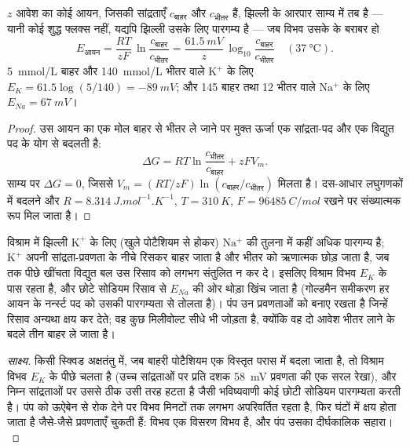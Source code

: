 \begin{theorem}[नर्न्स्ट समीकरण]\label{thm:b1:membranes-transport:nernst}
$z$ आवेश का कोई आयन, जिसकी सांद्रताएँ $c_{\text{बाहर}}$ और
$c_{\text{भीतर}}$ हैं, झिल्ली के आरपार साम्य में तब है --- यानी कोई
शुद्ध फ्लक्स नहीं, यद्यपि झिल्ली उसके लिए पारगम्य है --- जब विभव उसके
\emph{} के बराबर हो
\[
E_{\text{आयन}} = \frac{RT}{zF}\,\ln\frac{c_{\text{बाहर}}}{c_{\text{भीतर}}}
= \frac{\qty{61.5}{mV}}{z}\,\log_{10}\frac{c_{\text{बाहर}}}{c_{\text{भीतर}}}
\quad (\qty{37}{\celsius}).
\]
\qty{5}{mmol/L} बाहर और \qty{140}{mmol/L} भीतर वाले $\mathrm{K^+}$ के
लिए $E_K = 61.5\log(5/140) = \qty{-89}{mV}$; और \qty{145}{} बाहर तथा
\qty{12}{} भीतर वाले $\mathrm{Na^+}$ के लिए $E_{Na} = \qty{+67}{mV}$।
\end{theorem}
\begin{proof}
उस आयन का एक मोल बाहर से भीतर ले जाने पर मुक्त ऊर्जा एक सांद्रता-पद और
एक विद्युत पद के योग से बदलती है:
\[
\Delta G = RT\ln\frac{c_{\text{भीतर}}}{c_{\text{बाहर}}} + zFV_m .
\]
साम्य पर $\Delta G = 0$, जिससे $V_m = (RT/zF)\ln(c_{\text{बाहर}}/c_{\text{भीतर}})$ मिलता है।
दस-आधार लघुगणकों में बदलने और $R = \qty{8.314}{J.mol^{-1}.K^{-1}}$,
$T = \qty{310}{K}$, $F = \qty{96485}{C/mol}$ रखने पर संख्यात्मक रूप मिल
जाता है।
\end{proof}

\begin{proposition}[विश्राम विभव का उद्गम]\label{prop:b1:membranes-transport:resting}
विश्राम में झिल्ली $\mathrm{K^+}$ के लिए (खुले पोटैशियम  से होकर)
$\mathrm{Na^+}$ की तुलना में कहीं अधिक पारगम्य है; $\mathrm{K^+}$ अपनी
सांद्रता-प्रवणता के नीचे रिसकर बाहर जाता है और भीतर को ऋणात्मक छोड़
जाता है, जब तक पीछे खींचता विद्युत बल उस रिसाव को लगभग संतुलित न कर दे।
इसलिए विश्राम विभव $E_K$ के पास रहता है, और छोटे सोडियम रिसाव से
$E_{Na}$ की ओर थोड़ा खिंच जाता है (गोल्डमैन समीकरण हर आयन के नर्न्स्ट पद
को उसकी पारगम्यता से तोलता है)। पंप उन प्रवणताओं को बनाए रखता है जिन्हें
रिसाव अन्यथा क्षय कर देते; वह कुछ मिलीवोल्ट सीधे भी जोड़ता है, क्योंकि
वह दो आवेश भीतर लाने के बदले तीन बाहर ले जाता है।
\end{proposition}
\begin{proof}[साक्ष्य]
किसी स्क्विड अक्षतंतु में, जब बाहरी पोटैशियम एक विस्तृत परास में बदला
जाता है, तो विश्राम विभव $E_K$ के पीछे चलता है (उच्च सांद्रताओं पर प्रति
दशक \qty{58}{mV} प्रवणता की एक सरल रेखा), और निम्न सांद्रताओं पर उससे
ठीक उसी तरह हटता है जैसी भविष्यवाणी कोई छोटी सोडियम पारगम्यता करती है।
पंप को ऊऐबेन से रोक देने पर विभव मिनटों तक लगभग अपरिवर्तित रहता है, फिर
घंटों में क्षय होता जाता है जैसे-जैसे प्रवणताएँ चुकती हैं: विभव एक
विसरण विभव है, और पंप उसका दीर्घकालिक सहारा।
\end{proof}

